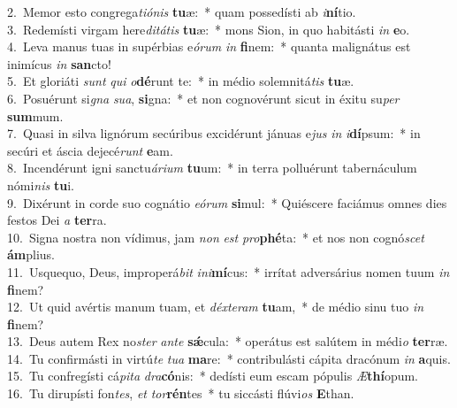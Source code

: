 {2.~}Memor esto congrega\textit{ti}\textit{ó}\textit{nis} \textbf{tu}æ:~* quam possedísti ab \textit{i}\textbf{ní}tio.\\
{3.~}Redemísti virgam here\textit{di}\textit{tá}\textit{tis} \textbf{tu}æ:~* mons Sion, in quo habitásti \textit{in} \textbf{e}o.\\
{4.~}Leva manus tuas in supérbias e\textit{ó}\textit{rum} \textit{in} \textbf{fi}nem:~* quanta malignátus est inimícus \textit{in} \textbf{san}cto!\\
{5.~}Et gloriáti \textit{sunt} \textit{qui} \textit{o}\textbf{dé}runt te:~* in médio solemnitá\textit{tis} \textbf{tu}æ.\\
{6.~}Posuérunt si\textit{gna} \textit{su}\textit{a}, \textbf{si}gna:~* et non cognovérunt sicut in éxitu su\textit{per} \textbf{sum}mum.\\
{7.~}Quasi in silva lignórum secúribus excidérunt jánuas e\textit{jus} \textit{in} \textit{i}\textbf{dí}psum:~* in secúri et áscia dejecé\textit{runt} \textbf{e}am.\\
{8.~}Incendérunt igni sanctu\textit{á}\textit{ri}\textit{um} \textbf{tu}um:~* in terra polluérunt tabernáculum nómi\textit{nis} \textbf{tu}i.\\
{9.~}Dixérunt in corde suo cognátio \textit{e}\textit{ó}\textit{rum} \textbf{si}mul:~* Quiéscere faciámus omnes dies festos Dei \textit{a} \textbf{ter}ra.\\
{10.~}Signa nostra non vídimus, jam \textit{non} \textit{est} \textit{pro}\textbf{phé}ta:~* et nos non cognó\textit{scet} \textbf{ám}plius.\\
{11.~}Usquequo, Deus, improperá\textit{bit} \textit{i}\textit{ni}\textbf{mí}cus:~* irrítat adversárius nomen tuum \textit{in} \textbf{fi}nem?\\
{12.~}Ut quid avértis manum tuam, et \textit{déx}\textit{te}\textit{ram} \textbf{tu}am,~* de médio sinu tuo \textit{in} \textbf{fi}nem?\\
{13.~}Deus autem Rex no\textit{ster} \textit{an}\textit{te} \textbf{sǽ}cula:~* operátus est salútem in médi\textit{o} \textbf{ter}ræ.\\
{14.~}Tu confirmásti in virtú\textit{te} \textit{tu}\textit{a} \textbf{ma}re:~* contribulásti cápita dracónum \textit{in} \textbf{a}quis.\\
{15.~}Tu confregísti cá\textit{pi}\textit{ta} \textit{dra}\textbf{có}nis:~* dedísti eum escam pópulis \textit{Æ}\textbf{thí}opum.\\
{16.~}Tu dirupísti fon\textit{tes}, \textit{et} \textit{tor}\textbf{rén}tes~* tu siccásti flúvi\textit{os} \textbf{E}than.\\

